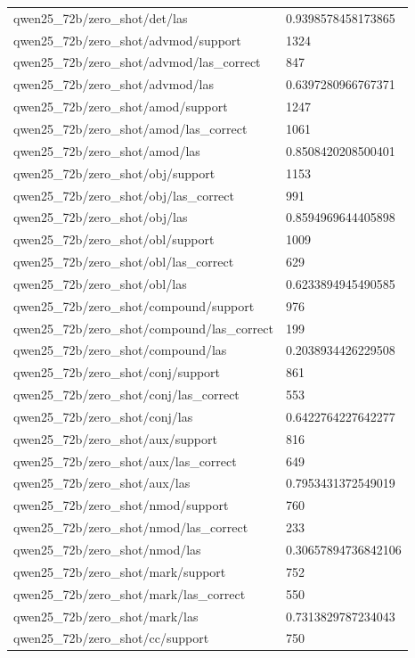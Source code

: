\begin{tabular}{ll}
qwen25\_72b/zero\_shot/det/las & 0.9398578458173865 \\
qwen25\_72b/zero\_shot/advmod/support & 1324 \\
qwen25\_72b/zero\_shot/advmod/las\_correct & 847 \\
qwen25\_72b/zero\_shot/advmod/las & 0.6397280966767371 \\
qwen25\_72b/zero\_shot/amod/support & 1247 \\
qwen25\_72b/zero\_shot/amod/las\_correct & 1061 \\
qwen25\_72b/zero\_shot/amod/las & 0.8508420208500401 \\
qwen25\_72b/zero\_shot/obj/support & 1153 \\
qwen25\_72b/zero\_shot/obj/las\_correct & 991 \\
qwen25\_72b/zero\_shot/obj/las & 0.8594969644405898 \\
qwen25\_72b/zero\_shot/obl/support & 1009 \\
qwen25\_72b/zero\_shot/obl/las\_correct & 629 \\
qwen25\_72b/zero\_shot/obl/las & 0.6233894945490585 \\
qwen25\_72b/zero\_shot/compound/support & 976 \\
qwen25\_72b/zero\_shot/compound/las\_correct & 199 \\
qwen25\_72b/zero\_shot/compound/las & 0.2038934426229508 \\
qwen25\_72b/zero\_shot/conj/support & 861 \\
qwen25\_72b/zero\_shot/conj/las\_correct & 553 \\
qwen25\_72b/zero\_shot/conj/las & 0.6422764227642277 \\
qwen25\_72b/zero\_shot/aux/support & 816 \\
qwen25\_72b/zero\_shot/aux/las\_correct & 649 \\
qwen25\_72b/zero\_shot/aux/las & 0.7953431372549019 \\
qwen25\_72b/zero\_shot/nmod/support & 760 \\
qwen25\_72b/zero\_shot/nmod/las\_correct & 233 \\
qwen25\_72b/zero\_shot/nmod/las & 0.30657894736842106 \\
qwen25\_72b/zero\_shot/mark/support & 752 \\
qwen25\_72b/zero\_shot/mark/las\_correct & 550 \\
qwen25\_72b/zero\_shot/mark/las & 0.7313829787234043 \\
qwen25\_72b/zero\_shot/cc/support & 750 \\

\end{tabular}
